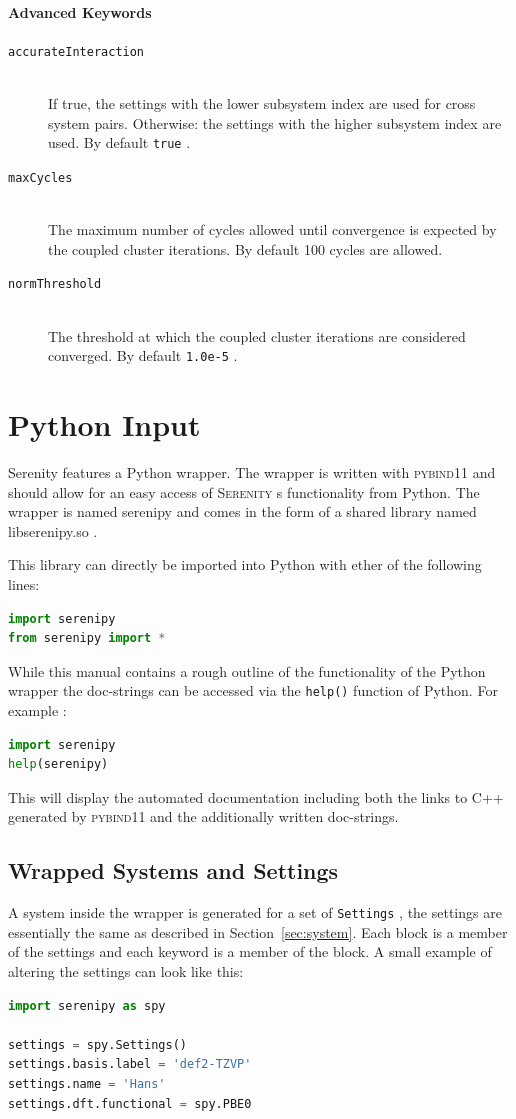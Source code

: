 \documentclass[bibliography=totocnumbered,a4paper,10pt,oneside]{scrbook}
\newcommand{
\serenity}{\textsc{Serenity}\xspace}
\newcommand{\ttt}[1]{%
  \begingroup\setlength{\fboxsep}{1pt}%
  \colorbox{serenity-green!30}{\texttt{\hspace*{2pt}\vphantom{(g}#1\hspace*{2pt}}}%
  \endgroup
}
\begin{document}
\subsubsection{Advanced Keywords}
\begin{description}
  \item[\texttt{accurateInteraction}]\hfill\\
  If true, the settings with the lower subsystem index are used for cross system pairs.
  Otherwise: the settings with the higher subsystem index are used. By default \ttt{true}.
  \item [\texttt{maxCycles}]\hfill \\
  The maximum number of cycles allowed until convergence is expected by the coupled cluster iterations.
  By default 100 cycles are allowed.
  \item [\texttt{normThreshold}]\hfill \\
  The threshold at which the coupled cluster iterations are considered converged. By default \ttt{1.0e-5}.
\end{description}



\clearpage
\chapter{Python Input}
Serenity features a Python wrapper.
The wrapper is written with \textsc{pybind11}\cite{pybind11} and should allow for an easy access of \serenity s functionality from Python.
The wrapper is named serenipy and comes in the form of a shared library named libserenipy.so .

This library can directly be imported into Python with ether of the following lines:
\begin{lstlisting}[language=Python]
import serenipy
from serenipy import *
\end{lstlisting}
While this manual contains a rough outline of the functionality of the Python wrapper the doc-strings can be accessed via the
\texttt{help()} function of Python. For example :
\begin{lstlisting}[language=Python]
import serenipy
help(serenipy)
\end{lstlisting}
This will display the automated documentation including both the links to C++ generated by \textsc{pybind11} and the additionally written doc-strings.
\section{Wrapped Systems and Settings}
A system inside the wrapper is generated for a set of \ttt{Settings},
the settings are essentially the same as described in Section~\ref{sec:system}.
Each block is a member of the settings and each keyword is a member of the block.
A small example of altering the settings can look like this:
\begin{lstlisting}[language=Python]
import serenipy as spy

settings = spy.Settings()
settings.basis.label = 'def2-TZVP'
settings.name = 'Hans'
settings.dft.functional = spy.PBE0
\end{lstlisting}
\end{document}
